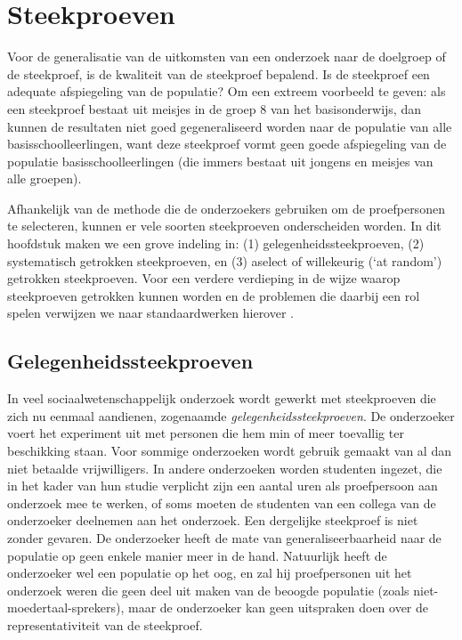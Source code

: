 \documentclass[
]{book}
\begin{document}
\hypertarget{ch:steekproeftrekking}{%
\chapter{Steekproeven}\label{ch:steekproeftrekking}}

Voor de generalisatie van de uitkomsten van een onderzoek naar de
doelgroep of de steekproef, is de kwaliteit van de steekproef bepalend.
Is de steekproef een adequate afspiegeling van de populatie? Om een
extreem voorbeeld te geven: als een steekproef bestaat uit meisjes in de
groep 8 van het basisonderwijs, dan kunnen de resultaten niet goed
gegeneraliseerd worden naar de populatie van alle basisschoolleerlingen,
want deze steekproef vormt geen goede afspiegeling van de populatie
basisschoolleerlingen (die immers bestaat uit jongens en meisjes van
alle groepen).

Afhankelijk van de methode die de onderzoekers gebruiken om de
proefpersonen te selecteren, kunnen er vele soorten steekproeven
onderscheiden worden. In dit hoofdstuk maken we een grove indeling in:
(1) gelegenheidssteekproeven, (2) systematisch getrokken steekproeven,
en (3) aselect of willekeurig (`at random') getrokken steekproeven. Voor
een verdere verdieping in de wijze waarop steekproeven getrokken kunnen
worden en de problemen die daarbij een rol spelen verwijzen we naar
standaardwerken hierover \citep{Coch77, Thom12}.

\hypertarget{sec:gelegenheidssteekproef}{%
\section{Gelegenheidssteekproeven}\label{sec:gelegenheidssteekproef}}

In veel sociaalwetenschappelijk onderzoek wordt gewerkt met steekproeven
die zich nu eenmaal aandienen, zogenaamde \emph{gelegenheidssteekproeven}. De
onderzoeker voert het experiment uit met personen die hem min of meer
toevallig ter beschikking staan. Voor sommige onderzoeken wordt gebruik
gemaakt van al dan niet betaalde vrijwilligers. In andere onderzoeken
worden studenten ingezet, die in het kader van hun studie verplicht zijn
een aantal uren als proefpersoon aan onderzoek mee te werken, of soms
moeten de studenten van een collega van de onderzoeker deelnemen aan het
onderzoek. Een dergelijke steekproef is niet zonder gevaren. De
onderzoeker heeft de mate van generaliseerbaarheid naar de populatie op
geen enkele manier meer in de hand. Natuurlijk heeft de onderzoeker wel
een populatie op het oog, en zal hij proefpersonen uit het onderzoek
weren die geen deel uit maken van de beoogde populatie (zoals
niet-moedertaal-sprekers), maar de onderzoeker kan geen uitspraken doen
over de representativiteit van de steekproef.
\end{document}
